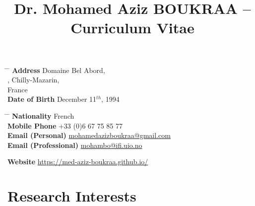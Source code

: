 \documentclass[10pt]{article} %
\begin{document}

\title{Dr. Mohamed Aziz BOUKRAA -- Curriculum Vitae} %





\parbox{0.5\textwidth}{ %
\begin{tabbing} %
\hspace{2.5cm} \= \hspace{4cm} \= \kill %
{\bf Address}  Domaine Bel Abord,\\ %
, Chilly-Mazarin,\\
\> France \\ %
{\bf Date of Birth} \>  December 11$^{th}$, 1994 \\%
\end{tabbing}}
\hspace{0.5cm}
\parbox{0.5\textwidth}{ %
\begin{tabbing} %
\hspace{3.5cm} \= \hspace{4cm} \= \kill %
{\bf Nationality} \> French \\%
{\bf Mobile Phone} \> +33 (0)6 67 75 85 77 \\ %
{\bf Email (Personal)} \> \href{mailto:mohamedazizboukraa@gmail.com}{mohamedazizboukraa@gmail.com} \\ %
{\bf Email (Professional)} \> \href{mailto:mohambo@ifi.uio.no}{mohambo@ifi.uio.no} \\ %
\end{tabbing}}

\vspace{-0.7cm}
{\bf Website}  \href{https://med-aziz-boukraa.github.io/}{https://med-aziz-boukraa.github.io/} \\ %

\section{Research Interests}
\end{document}
